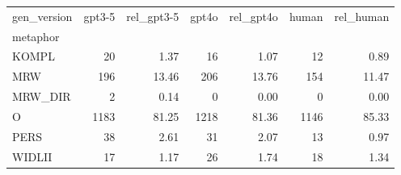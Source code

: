 \begin{tabular}{lrrrrrr}
\toprule
gen_version & gpt3-5 & rel_gpt3-5 & gpt4o & rel_gpt4o & human & rel_human \\
metaphor &  &  &  &  &  &  \\
\midrule
KOMPL & 20 & 1.37 & 16 & 1.07 & 12 & 0.89 \\
MRW & 196 & 13.46 & 206 & 13.76 & 154 & 11.47 \\
MRW\_DIR & 2 & 0.14 & 0 & 0.00 & 0 & 0.00 \\
O & 1183 & 81.25 & 1218 & 81.36 & 1146 & 85.33 \\
PERS & 38 & 2.61 & 31 & 2.07 & 13 & 0.97 \\
WIDLII & 17 & 1.17 & 26 & 1.74 & 18 & 1.34 \\
\bottomrule
\end{tabular}
